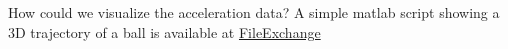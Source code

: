 How could we visualize the acceleration data?
A simple matlab script showing a 3D trajectory of a ball is available at 
\href{http://www.mathworks.com/matlabcentral/fileexchange/22913-bouncing-ball-physics}{FileExchange}
